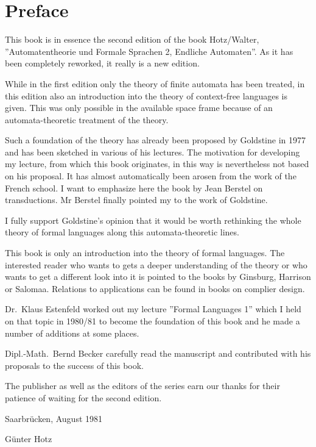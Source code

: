 \chapter*{Preface}

This book is in essence the second edition of the book Hotz/Walter,
''Automatentheorie und Formale Sprachen 2, Endliche Automaten''. As it has been
completely reworked, it really is a new edition.

While in the first edition only the theory of finite automata has been treated,
in this edition also an introduction into the theory of context-free languages
is given. This was only possible in the available space frame because
of an automata-theoretic treatment of the theory.

Such a foundation of the theory has already been proposed by Goldstine in 1977
and has been sketched in various of his lectures. The motivation for developing
my lecture, from which this book originates, in this way is nevertheless not
based on his proposal. It has almost automatically been arosen from the
work of the French school. I want to emphasize here the book by Jean Berstel on
transductions. Mr Berstel finally pointed my to the work of Goldstine.

I fully support Goldstine's opinion that it would be worth rethinking the whole
theory of formal languages along this automata-theoretic lines.

This book is only an introduction into the theory of formal languages. The
interested reader who wants to gets a deeper understanding of the theory or who
wants to get a different look into it is pointed to the books by Ginsburg,
Harrison or Salomaa. Relations to applications can be found in books on complier
design.

Dr.\ Klaus Estenfeld worked out my lecture ''Formal Languages 1'' which I held
on that topic in 1980/81 to become the foundation of this book and he made a number
of additions at some places.

Dipl.-Math.\ Bernd Becker carefully read the manuscript and contributed with his
proposals to the success of this book.

The publisher as well as the editors of the series earn our thanks for their
patience of waiting for the second edition.

\vspace{2ex}

Saarbrücken, August 1981

Günter Hotz
